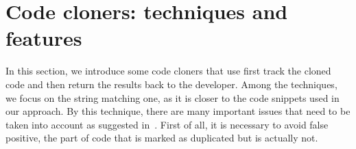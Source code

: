 


\section{Code cloners: techniques and features} \label{sec:CodeCloners}


In this section, we introduce some code cloners that use first track the cloned code and then return the results back to the developer. Among the techniques, we focus on the string matching one, as it is closer to the code snippets used in our approach. By this technique, there are many important issues that need to be taken into account as suggested in~\cite{stephane_ducasse_effectiveness_2005}. First of all, it is necessary to avoid false positive, \ie the part of code that is marked as duplicated but is actually not.%

